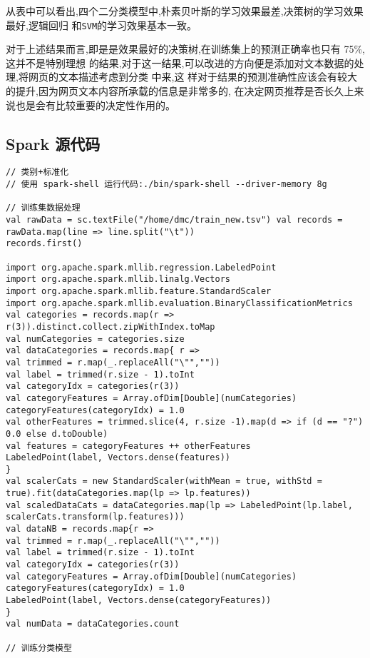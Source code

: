 从表中可以看出,四个二分类模型中,朴素贝叶斯的学习效果最差,决策树的学习效果最好,逻辑回归
和\texttt{SVM}的学习效果基本一致。

对于上述结果而言,即是是效果最好的决策树,在训练集上的预测正确率也只有
75\%,这并不是特别理想
的结果,对于这一结果,可以改进的方向便是添加对文本数据的处理,将网页的文本描述考虑到分类
中来,这
样对于结果的预测准确性应该会有较大的提升,因为网页文本内容所承载的信息是非常多的,
在决定网页推荐是否长久上来说也是会有比较重要的决定性作用的。

\subsection{Spark 源代码}\label{spark-ux6e90ux4ee3ux7801}

\begin{lstlisting}
// 类别+标准化
// 使用 spark-shell 运行代码:./bin/spark-shell --driver-memory 8g

// 训练集数据处理
val rawData = sc.textFile("/home/dmc/train_new.tsv") val records = rawData.map(line => line.split("\t"))
records.first()

import org.apache.spark.mllib.regression.LabeledPoint
import org.apache.spark.mllib.linalg.Vectors
import org.apache.spark.mllib.feature.StandardScaler
import org.apache.spark.mllib.evaluation.BinaryClassificationMetrics
val categories = records.map(r => r(3)).distinct.collect.zipWithIndex.toMap
val numCategories = categories.size
val dataCategories = records.map{ r =>
val trimmed = r.map(_.replaceAll("\"",""))
val label = trimmed(r.size - 1).toInt
val categoryIdx = categories(r(3))
val categoryFeatures = Array.ofDim[Double](numCategories) categoryFeatures(categoryIdx) = 1.0
val otherFeatures = trimmed.slice(4, r.size -1).map(d => if (d == "?") 0.0 else d.toDouble)
val features = categoryFeatures ++ otherFeatures
LabeledPoint(label, Vectors.dense(features))
}
val scalerCats = new StandardScaler(withMean = true, withStd = true).fit(dataCategories.map(lp => lp.features))
val scaledDataCats = dataCategories.map(lp => LabeledPoint(lp.label, scalerCats.transform(lp.features)))
val dataNB = records.map{r =>
val trimmed = r.map(_.replaceAll("\"",""))
val label = trimmed(r.size - 1).toInt
val categoryIdx = categories(r(3))
val categoryFeatures = Array.ofDim[Double](numCategories) categoryFeatures(categoryIdx) = 1.0
LabeledPoint(label, Vectors.dense(categoryFeatures))
}
val numData = dataCategories.count

// 训练分类模型


\end{lstlisting}
